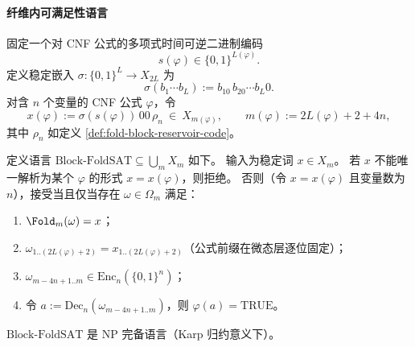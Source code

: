 \paragraph{纤维内可满足性语言}
固定一个对 CNF 公式的多项式时间可逆二进制编码
\[
s(\varphi)\in\{0,1\}^{L(\varphi)}.
\]
定义稳定嵌入 \(\sigma:\{0,1\}^{L}\to X_{2L}\) 为
\[
\sigma(b_1\cdots b_L):=b_10\,b_20\cdots b_L0.
\]
对含 \(n\) 个变量的 CNF 公式 \(\varphi\)，令
\[
x(\varphi):=\sigma(s(\varphi))\,00\,\rho_n\ \in\ X_{m(\varphi)},
\qquad
m(\varphi):=2L(\varphi)+2+4n,
\]
其中 \(\rho_n\) 如定义 \ref{def:fold-block-reservoir-code}。

\begin{definition}\label{def:block-foldsat-language}
定义语言 \(\mathrm{Block}\text{-}\mathrm{FoldSAT}\subseteq\bigcup_m X_m\) 如下。
输入为稳定词 \(x\in X_m\)。
若 \(x\) 不能唯一解析为某个 \(\varphi\) 的形式 \(x=x(\varphi)\)，则拒绝。
否则（令 \(x=x(\varphi)\) 且变量数为 \(n\)），接受当且仅当存在 \(\omega\in\Omega_m\) 满足：
\begin{enumerate}
  \item \(\Fold_m(\omega)=x\)；
  \item \(\omega_{1..(2L(\varphi)+2)}=x_{1..(2L(\varphi)+2)}\)（公式前缀在微态层逐位固定）；
  \item \(\omega_{m-4n+1..m}\in \mathrm{Enc}_n(\{0,1\}^n)\)；
  \item 令 \(a:=\mathrm{Dec}_n(\omega_{m-4n+1..m})\)，则 \(\varphi(a)=\mathrm{TRUE}\)。
\end{enumerate}
\end{definition}

\begin{theorem}\label{thm:block-foldsat-np-complete}
\(\mathrm{Block}\text{-}\mathrm{FoldSAT}\) 是 NP 完备语言（Karp 归约意义下）。
\end{theorem}

